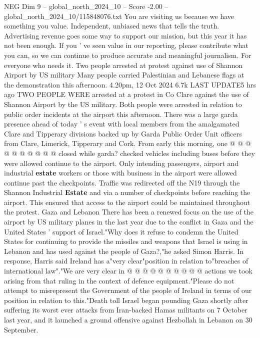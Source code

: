 \begin{textsample}{NEG Dim 9 – global\_north\_2024\_10 – Score -2.00 – global\_north\_2024\_10/115848076.txt}  \label{ex:f9_neg_228}
You are visiting us because we have something you value.
Independent, unbiased news that tells the truth.
Advertising revenue goes some way to support our mission, but this year it has not been enough.
If you ' ve seen value in our reporting, please contribute what you can, so we can continue to produce accurate and meaningful journalism.
For everyone who needs it.
Two people arrested at protest against use of Shannon Airport by US military Many people carried Palestinian and Lebanese flags at the demonstration this afternoon. 4.20pm, 12 Oct 2024 6.7k LAST UPDATE5 hrs ago TWO PEOPLE WERE arrested at a protest in Co Clare against the use of Shannon Airport by the US military.
Both people were arrested in relation to public order incidents at the airport this afternoon.
There was a large garda presence ahead of today ' s event with local members from the amalgamated Clare and Tipperary divisions backed up by Garda Public Order Unit officers from Clare, Limerick, Tipperary and Cork.
From early this morning, one @ @ @ @ @ @ @ @ @ @ closed while garda? checked vehicles including buses before they were allowed continue to the airport.
Only intending passengers, airport and industrial \textbf{estate} workers or those with business in the airport were allowed continue past the checkpoints.
Traffic was redirected off the N19 through the Shannon Industrial \textbf{Estate} and via a number of checkpoints before reaching the airport.
This ensured that access to the airport could be maintained throughout the protest.
Gaza and Lebanon There has been a renewed focus on the use of the airport by US military planes in the last year due to the conflict in Gaza and the United States ' support of Israel."Why does it refuse to condemn the United States for continuing to provide the missiles and weapons that Israel is using in Lebanon and has used against the people of Gaza?,"he asked Simon Harris.
In response, Harris said Ireland has a"very clear"position in relation to"breaches of international law"."We are very clear in @ @ @ @ @ @ @ @ @ @ actions we took arising from that ruling in the context of defence equipment."Please do not attempt to misrepresent the Government of the people of Ireland in terms of our position in relation to this."Death toll Israel began pounding Gaza shortly after suffering its worst ever attacks from Iran-backed Hamas militants on 7 October last year, and it launched a ground offensive against Hezbollah in Lebanon on 30 September.

\end{textsample}
